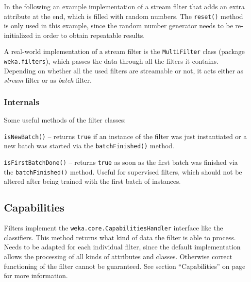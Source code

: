 \newpage
In the following an example implementation of a stream filter that adds an extra
attribute at the end, which is filled with random numbers. The \texttt{reset()}
method is only used in this example, since the random number generator needs to
be re-initialized in order to obtain repeatable results.

{\footnotesize }

\noindent A real-world implementation of a stream filter is the
\texttt{MultiFilter} class (package \texttt{weka.filters}), which passes the
data through all the filters it contains. Depending on whether all the used
filters are streamable or not, it acts either as \textit{stream} filter or as
\textit{batch} filter.

\newpage
\subsubsection{Internals}
Some useful methods of the filter classes:
\begin{tight_itemize}
  \item \texttt{isNewBatch()} -- returns \texttt{true} if an instance of the
filter was just instantiated or a new batch was started via the
\texttt{batchFinished()} method.
  \item \texttt{isFirstBatchDone()} -- returns \texttt{true} as soon as the
first batch was finished via the \texttt{batchFinished()} method. Useful for
supervised filters, which should not be altered after being trained with the
first batch of instances.
\end{tight_itemize}

\subsection{Capabilities}
\label{filter_capabilities}
Filters implement the \texttt{weka.core.CapabilitiesHandler} interface like the
classifiers. This method returns what kind of data the filter is able to
process. Needs to be adapted for each individual filter, since the default
implementation allows the processing of all kinds of attributes and classes.
Otherwise correct functioning of the filter cannot be guaranteed. See section
``Capabilities'' on page \pageref{classifier_capabilities} for more information.

